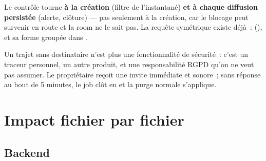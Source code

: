 Le contrôle tourne \textbf{à la création} (filtre de l'instantané) \textbf{et à chaque
diffusion persistée} (alerte, clôture) --- pas seulement à la création, car le blocage peut
survenir en route et la room ne le sait pas. La requête symétrique existe déjà~:
 (), et sa forme groupée dans
.

\begin{alerte}
Un trajet sans destinataire n'est plus une fonctionnalité de sécurité~: c'est un traceur
personnel, un autre produit, et une responsabilité RGPD qu'on ne veut pas assumer. Le
propriétaire reçoit une invite immédiate et sonore~; sans réponse au bout de 5 minutes, le
job  clôt en  et la purge normale s'applique.
\end{alerte}

\chapter{Impact fichier par fichier}

\section{Backend}

